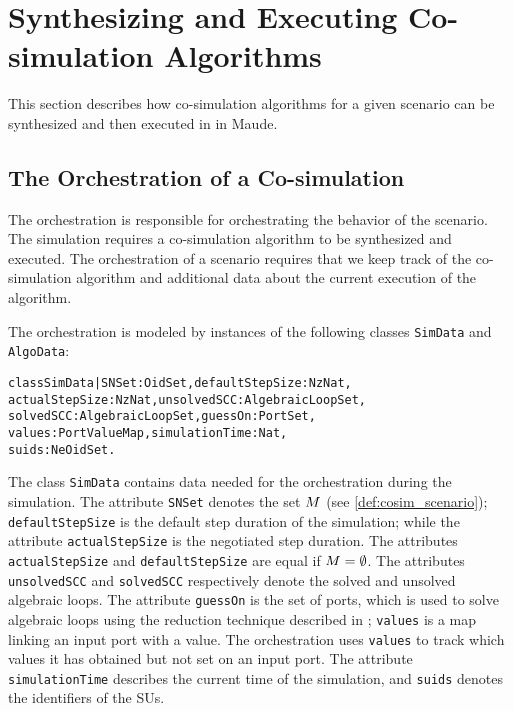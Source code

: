 \section{Synthesizing and Executing Co-simulation Algorithms}\label{sc:synthesize}
This section describes how co-simulation algorithms for a given scenario can be synthesized and then executed in in Maude.

\subsection{The Orchestration of a Co-simulation}
The orchestration is responsible for orchestrating the behavior of the scenario. 
The simulation requires a co-simulation algorithm to be synthesized and executed.
The orchestration of a scenario requires that we keep track of the co-simulation algorithm and additional data about the current execution of the algorithm.

The orchestration is modeled by instances of the following classes \texttt{SimData} and \texttt{AlgoData}:

\small
\begin{alltt}
class SimData | SNSet : OidSet,           defaultStepSize : NzNat,
          actualStepSize : NzNat,         unsolvedSCC : AlgebraicLoopSet, 
          solvedSCC : AlgebraicLoopSet,   guessOn : PortSet,
          values : PortValueMap,          simulationTime : Nat,
          suids : NeOidSet .
\end{alltt}
\normalsize

The class \texttt{SimData} contains data needed for the orchestration during the simulation.
The attribute \texttt{SNSet} denotes the set $M$ (see \cref{def:cosim_scenario}); \texttt{defaultStepSize} is the default step duration of the simulation; while the attribute \texttt{actualStepSize} is the negotiated step duration.
The attributes \texttt{actualStepSize} and \texttt{defaultStepSize} are equal if $M = \emptyset$.
The attributes \texttt{unsolvedSCC} and \texttt{solvedSCC} respectively denote the solved and unsolved algebraic loops.
The attribute \texttt{guessOn} is the set of ports, which is used to solve algebraic loops using the reduction technique described in \cite{thrane2021}; \texttt{values} is a map linking an input port with a value. 
The orchestration uses \texttt{values} to track which values it has obtained but not set on an input port. 
The attribute \texttt{simulationTime} describes the current time of the simulation, and \texttt{suids} denotes the identifiers of the SUs.

